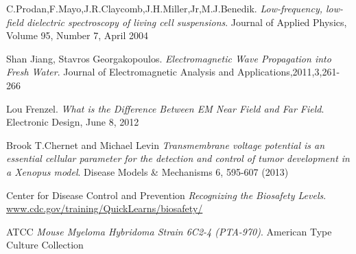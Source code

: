 \documentclass[journal]{IEEEtran}
\begin{document}
\begin{thebibliography}{9}

C.Prodan,F.Mayo,J.R.Claycomb,J.H.Miller,Jr,M.J.Benedik.
\textit{Low-frequency, low-field dielectric spectroscopy of living cell suspensions}.
Journal of Applied Physics, Volume 95, Number 7, April 2004

Shan Jiang, Stavros Georgakopoulos.
\textit{Electromagnetic Wave Propagation into Fresh Water}.
Journal of Electromagnetic Analysis and Applications,2011,3,261-266

Lou Frenzel.
\textit{What is the Difference Between EM Near Field and Far Field}.
Electronic Design, June 8, 2012

Brook T.Chernet and Michael Levin
\textit{Transmembrane voltage potential is an essential cellular parameter for the detection and control of tumor development in a Xenopus model}. 
Disease Models & Mechanisms 6, 595-607 (2013)

Center for Disease Control and Prevention
\textit{Recognizing the Biosafety Levels}.
\url{www.cdc.gov/training/QuickLearns/biosafety/}

ATCC
\textit{Mouse Myeloma Hybridoma Strain 6C2-4 (PTA-970)}.
American Type Culture Collection

\end{thebibliography}
\end{document}
